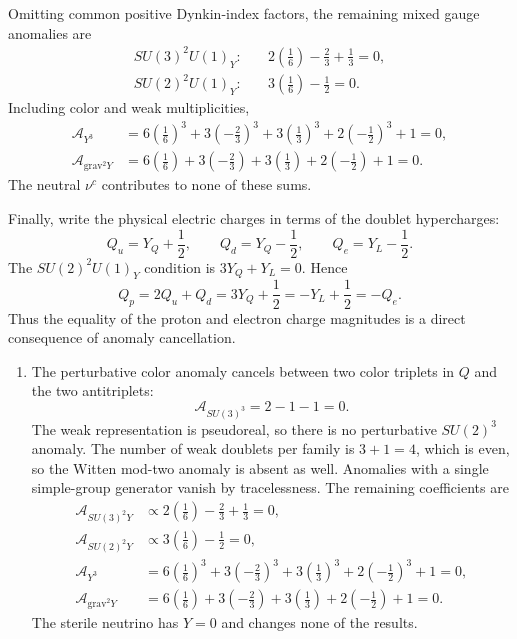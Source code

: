 \begin{enumerate}
\begin{enumerate}
    Omitting common positive Dynkin-index factors, the remaining mixed
    gauge anomalies are
    \[
    \begin{aligned}
      SU(3)^2U(1)_Y:\quad&
       2\left(\frac16\right)-\frac23+\frac13=0,\\
      SU(2)^2U(1)_Y:\quad&
       3\left(\frac16\right)-\frac12=0.
    \end{aligned}
    \]
    Including color and weak multiplicities,
    \[
    \begin{aligned}
      \mathcal A_{Y^3}
       &=6\left(\frac16\right)^3
        +3\left(-\frac23\right)^3
        +3\left(\frac13\right)^3
        +2\left(-\frac12\right)^3+1=0,\\
      \mathcal A_{\mathrm{grav}^2Y}
       &=6\left(\frac16\right)
        +3\left(-\frac23\right)
        +3\left(\frac13\right)
        +2\left(-\frac12\right)+1=0.
    \end{aligned}
    \]
    The neutral \(\nu^c\) contributes to none of these sums.

    Finally, write the physical electric charges in terms of the
    doublet hypercharges:
    \[
      Q_u=Y_Q+\frac12,\qquad
      Q_d=Y_Q-\frac12,\qquad
      Q_e=Y_L-\frac12.
    \]
    The \(SU(2)^2U(1)_Y\) condition is
    \(3Y_Q+Y_L=0\).  Hence
    \[
      Q_p=2Q_u+Q_d=3Y_Q+\frac12
       =-Y_L+\frac12=-Q_e.
    \]
    Thus the equality of the proton and electron charge magnitudes is a
    direct consequence of anomaly cancellation.
  \end{enumerate}

  \begin{enumerate}
    \item[(i)]
    The perturbative color anomaly cancels between two color triplets in
    \(Q\) and the two antitriplets:
    \[
      \mathcal A_{SU(3)^3}=2-1-1=0.
    \]
    The weak representation is pseudoreal, so there is no perturbative
    \(SU(2)^3\) anomaly.  The number of weak doublets per family is
    \(3+1=4\), which is even, so the Witten mod-two anomaly is absent as
    well.  Anomalies with a single simple-group generator vanish by
    tracelessness.  The remaining coefficients are
    \[
    \begin{aligned}
      \mathcal A_{SU(3)^2Y}
       &\propto
        2\left(\frac16\right)-\frac23+\frac13=0,\\
      \mathcal A_{SU(2)^2Y}
       &\propto
        3\left(\frac16\right)-\frac12=0,\\
      \mathcal A_{Y^3}
       &=6\left(\frac16\right)^3
        +3\left(-\frac23\right)^3
        +3\left(\frac13\right)^3
        +2\left(-\frac12\right)^3+1=0,\\
      \mathcal A_{\mathrm{grav}^2Y}
       &=6\left(\frac16\right)
        +3\left(-\frac23\right)
        +3\left(\frac13\right)
        +2\left(-\frac12\right)+1=0.
    \end{aligned}
    \]
    The sterile neutrino has \(Y=0\) and changes none of the results.


\end{enumerate}
\end{enumerate}
